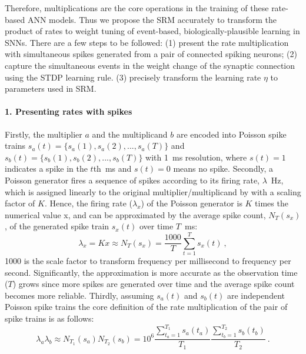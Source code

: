 Therefore, multiplications are the core operations in the training of these rate-based ANN models.
Thus we propose the SRM accurately to transform the product of rates to weight tuning of event-based, biologically-plausible learning in SNNs.
There are a few steps to be followed: (1) present the rate multiplication with simultaneous spikes generated from a pair of connected spiking neurons;
(2) capture the simultaneous events in the weight change of the synaptic connection using the STDP learning rule.
(3) precisely transform the learning rate $\eta$ to parameters used in SRM.

\paragraph{1. Presenting rates with spikes\\}
Firstly, the multiplier $a$ and the multiplicand $b$ are encoded into Poisson spike trains $s_a(t)=\{s_a(1),s_a(2),...,s_a(T)\}$ and $s_b(t)=\{s_b(1),s_b(2),...,s_b(T)\}$ with 1~ms resolution, where $s(t)=1$ indicates a spike in the $t$th~ms and $s(t)=0$ means no spike.
Secondly, a Poisson generator fires a sequence of spikes according to its firing rate, $\lambda$~Hz, which is assigned linearly to the original multiplier/multiplicand by with a scaling factor of $K$.
Hence, the firing rate ($\lambda_x$) of the Poisson generator is $K$ times the numerical value x, and can be approximated by the average spike count, $N_T(s_x)$, of the generated spike train $s_x(t)$ over time $T$~ms:
\begin{equation}
\lambda_x = Kx \approx N_T(s_x) = \frac{1000}{T} \sum_{t=1}^{T} s_x(t)~,
\end{equation} 
1000 is the scale factor to transform frequency per millisecond to frequency per second.
Significantly, the approximation is more accurate as the observation time ($T$) grows since more spikes are generated over time and the average spike count becomes more reliable.
Thirdly, assuming $s_a(t)$ and $s_b(t)$ are independent Poisson spike trains the core definition of the rate multiplication of the pair of spike trains is as follows:
\begin{equation}
\lambda_a \lambda_b \approx N_{T_1}(s_a)N_{T_2}(s_b)= 10^6 \frac{\sum_{t_a=1}^{T_1}s_a(t_a)}{T_1}  \frac{\sum_{t_b=1}^{T_2} s_b(t_b)}{T_2}~.
\label{equ:mul}
\end{equation} 

